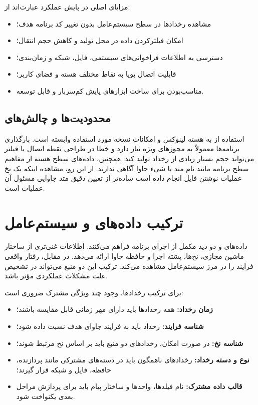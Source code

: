 مزایای اصلی  در پایش عملکرد عبارت‌اند از:

\begin{itemize}
    \item مشاهده رخدادها در سطح سیستم‌عامل بدون تغییر کد برنامه هدف؛
    \item امکان فیلترکردن داده در محل تولید و کاهش حجم انتقال؛
    \item دسترسی به اطلاعات فراخوانی‌های سیستمی، فایل، شبکه و زمان‌بندی؛
    \item قابلیت اتصال پویا به نقاط مختلف هسته و فضای کاربر؛
    \item مناسب‌بودن برای ساخت ابزارهای پایش کم‌سربار و قابل توسعه.
\end{itemize}

\subsection{محدودیت‌ها و چالش‌های }

استفاده از  به هسته لینوکس و امکانات نسخه مورد استفاده وابسته است.
بارگذاری برنامه‌ها معمولاً به مجوزهای ویژه نیاز دارد و خطا در طراحی نقطه اتصال
یا فیلتر می‌تواند حجم بسیار زیادی از رخداد تولید کند. همچنین، داده‌های سطح هسته
از مفاهیم سطح برنامه مانند نام متد یا شیء جاوا آگاهی ندارند. از این رو، مشاهده
اینکه یک نخ عملیات نوشتن فایل انجام داده است ساده‌تر از تعیین دقیق متد جاوایی
مسئول آن عملیات است.

\section{ترکیب داده‌های  و سیستم‌عامل}
\label{sec:jvm-kernel-correlation}

داده‌های  و  دو دید مکمل از اجرای برنامه فراهم می‌کنند.
 اطلاعات غنی‌تری از ساختار ماشین مجازی، نخ‌ها، پشته اجرا و حافظه جاوا
ارائه می‌دهد. در مقابل،  رفتار واقعی فرایند را در مرز سیستم‌عامل
مشاهده می‌کند. ترکیب این دو منبع می‌تواند در تشخیص علت مشکلات عملکردی مؤثر باشد.

برای ترکیب رخدادها، وجود چند ویژگی مشترک ضروری است:

\begin{itemize}
    \item \textbf{زمان رخداد:} همه رخدادها باید دارای مهر زمانی قابل مقایسه
    باشند؛
    \item \textbf{شناسه فرایند:} رخداد باید به فرایند جاوای هدف نسبت داده شود؛
    \item \textbf{شناسه نخ:} در صورت امکان، رخدادهای دو منبع باید بر اساس نخ
    مرتبط شوند؛
    \item \textbf{نوع و دسته رخداد:} رخدادهای ناهمگون باید در دسته‌های مشترکی
    مانند پردازنده، حافظه، فایل و شبکه قرار گیرند؛
    \item \textbf{قالب داده مشترک:} نام فیلدها، واحدها و ساختار پیام باید برای
    پردازش مراحل بعدی یکنواخت شود.
\end{itemize}

